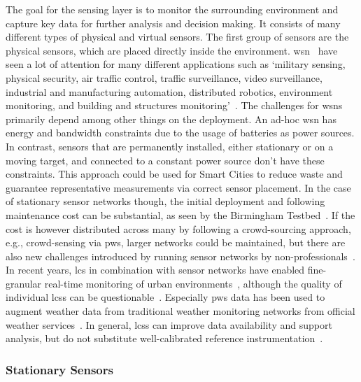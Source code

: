 The goal for the sensing layer is to monitor the surrounding environment and capture key data for further analysis and decision making. It consists of many different types of physical and virtual sensors. The first group of sensors are the physical sensors, which are placed directly inside the environment. \gls{wsn}~\cite{dargie2010fundamentals} have seen a lot of attention for many different applications such as `military sensing, physical security, air traffic control, traffic surveillance, video surveillance, industrial and manufacturing automation, distributed robotics, environment monitoring, and building and structures monitoring'~\cite{chong2003sensor}. The challenges for \gls{wsn}s primarily depend among other things on the deployment. An ad-hoc \gls{wsn} has energy and bandwidth constraints due to the usage of batteries as power sources.
In contrast, sensors that are permanently installed, either stationary or on a moving target, and connected to a constant power source don't have these constraints. This approach could be used for Smart Cities to reduce waste and guarantee representative measurements via correct sensor placement. In the case of stationary sensor networks though, the initial deployment and following maintenance cost can be substantial, as seen by the Birmingham Testbed~\cite{chapman2015birmingham}. If the cost is however distributed across many by following a crowd-sourcing approach, e.g., crowd-sensing via \gls{pws}, larger networks could be maintained, but there are also new challenges introduced by running sensor networks by non-professionals~\cite{meier2017crowdsourcing}.\\
In recent years, \gls{lcs} in combination with sensor networks have enabled fine-granular real-time monitoring of urban environments~\cite{grimmond2006progress, rundel2009environmental}, although the quality of individual \gls{lcs}s can be questionable~\cite{castell2017can}. Especially \gls{pws} data has been used to augment weather data from traditional weather monitoring networks from official weather services~\cite{hahn2022observations}. In general, \gls{lcs}s can improve data availability and support analysis, but do not substitute well-calibrated reference instrumentation~\cite{lewis2018low}.

\subsubsection{Stationary Sensors}

